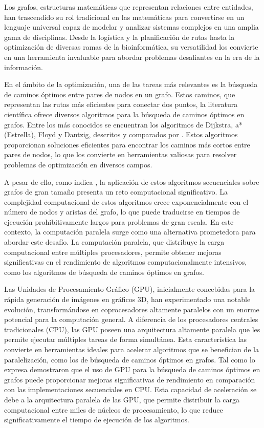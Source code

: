 Los grafos, estructuras matemáticas que representan relaciones entre entidades, han trascendido su rol tradicional en las matemáticas para convertirse en un lenguaje universal capaz de modelar y analizar sistemas complejos en una amplia gama de disciplinas. Desde la logística y la planificación de rutas hasta la optimización de diversas ramas de la bioinformática, su versatilidad los convierte en una herramienta invaluable para abordar problemas desafiantes en la era de la información. 

En el ámbito de la optimización, una de las tareas más relevantes es la búsqueda de caminos óptimos entre pares de nodos en un grafo. Estos caminos, que representan las rutas más eficientes para conectar dos puntos,  la literatura científica ofrece diversos algoritmos para la búsqueda de caminos óptimos en grafos. Entre los más conocidos se encuentran los algoritmos de Dijkstra, a* (Estrella), Floyd y Dantzig, descritos y comparados por \cite{Minieka}. Estos algoritmos proporcionan soluciones eficientes para encontrar los caminos más cortos entre pares de nodos, lo que los convierte en herramientas valiosas para resolver problemas de optimización en diversos campos.

A pesar de ello, como indica \cite{Harish}, la aplicación de estos algoritmos secuenciales sobre grafos de gran tamaño presenta un reto computacional significativo. La complejidad computacional de estos algoritmos crece exponencialmente con el número de nodos y aristas del grafo, lo que puede traducirse en tiempos de ejecución prohibitivamente largos para problemas de gran escala.
En este contexto, la computación paralela surge como una alternativa prometedora para abordar este desafío. La computación paralela, que distribuye la carga computacional entre múltiples procesadores, permite obtener mejoras significativas en el rendimiento de algoritmos computacionalmente intensivos, como los algoritmos de búsqueda de caminos óptimos en grafos.

Las Unidades de Procesamiento Gráfico (GPU), inicialmente concebidas para la rápida generación de imágenes en gráficos 3D, han experimentado una notable evolución, transformándose en coprocesadores altamente paralelos con un enorme potencial para la computación general. A diferencia de los procesadores centrales tradicionales (CPU), las GPU poseen una arquitectura altamente paralela que les permite ejecutar múltiples tareas de forma simultánea. Esta característica las convierte en herramientas ideales para acelerar algoritmos que se benefician de la paralelización, como los de búsqueda de caminos óptimos en grafos. 
 Tal como lo expresa \cite{Boyer} demostraron que el uso de GPU para la búsqueda de caminos óptimos en grafos puede proporcionar mejoras significativas de rendimiento en comparación con las implementaciones secuenciales en CPU. Esta capacidad de aceleración se debe a la arquitectura paralela de las GPU, que permite distribuir la carga computacional entre miles de núcleos de procesamiento, lo que reduce significativamente el tiempo de ejecución de los algoritmos.

